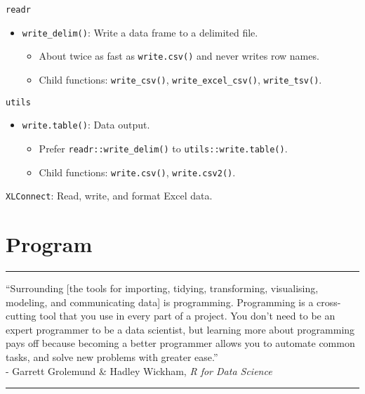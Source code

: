 \documentclass[]{book}
\providecommand{\tightlist}{%
  \setlength{\itemsep}{0pt}\setlength{\parskip}{0pt}}
\theoremstyle{definition}
\theoremstyle{definition}
\theoremstyle{definition}
\theoremstyle{remark}
\begin{document}
\texttt{readr}

\begin{itemize}
\tightlist
\item
  \texttt{write\_delim()}: Write a data frame to a delimited file.

  \begin{itemize}
  \tightlist
  \item
    About twice as fast as \texttt{write.csv()} and never writes row
    names.
  \item
    Child functions: \texttt{write\_csv()},
    \texttt{write\_excel\_csv()}, \texttt{write\_tsv()}.
  \end{itemize}
\end{itemize}

\texttt{utils}

\begin{itemize}
\tightlist
\item
  \texttt{write.table()}: Data output.

  \begin{itemize}
  \tightlist
  \item
    Prefer \texttt{readr::write\_delim()} to
    \texttt{utils::write.table()}.
  \item
    Child functions: \texttt{write.csv()}, \texttt{write.csv2()}.
  \end{itemize}
\end{itemize}

\texttt{XLConnect}: Read, write, and format Excel data.

\chapter{Program}\label{program}

\begin{center}\rule{0.5\linewidth}{\linethickness}\end{center}

``Surrounding {[}the tools for importing, tidying, transforming,
visualising, modeling, and communicating data{]} is programming.
Programming is a cross-cutting tool that you use in every part of a
project. You don't need to be an expert programmer to be a data
scientist, but learning more about programming pays off because becoming
a better programmer allows you to automate common tasks, and solve new
problems with greater ease.''\\
- Garrett Grolemund \& Hadley Wickham, \emph{R for Data Science}

\begin{center}\rule{0.5\linewidth}{\linethickness}\end{center}
\end{document}
